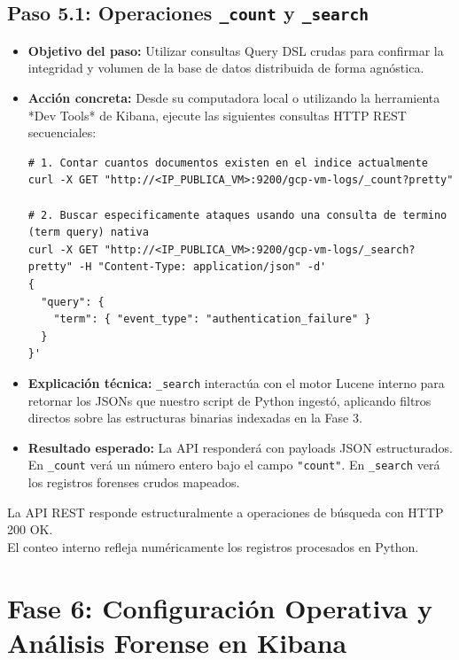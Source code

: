\documentclass[
  coursetitle={Cómputo Nube y Tecnologías Emergentes},
  coursehours={96},
  coursedate={Verano 2026},
  doctype={Guía de Laboratorio Práctico},
  otherlangs={english,french},
  authorname={Lázaro},
  authorsurname={Bustio-Martínez},
  authortitle={PhD},
  role={Profesor Investigador},
  email={lbustio@inaoe.mx},
  phone={5559504000},
  ext={7459},
  institution={Instituto Nacional de Astrofísica, Óptica y Electrónica (INAOE)},
  department={Maestría en Ciencias en Tecnologías de Seguridad},
  address={Luis Enrique Erro 1, Sta. Ma. Tonantzintla, San Andrés Cholula, CP 72840, Puebla, México},
  margin={0.5in}
]{../../lbustio_lecture_notes}
\begin{document}
\subsection{Paso 5.1: Operaciones \texttt{\_count} y \texttt{\_search}}
\begin{itemize}
    \item \textbf{Objetivo del paso:} Utilizar consultas Query DSL crudas para confirmar la integridad y volumen de la base de datos distribuida de forma agnóstica.
    \item \textbf{Acción concreta:} Desde su computadora local o utilizando la herramienta *Dev Tools* de Kibana, ejecute las siguientes consultas HTTP REST secuenciales:
\begin{verbatim}
# 1. Contar cuantos documentos existen en el indice actualmente
curl -X GET "http://<IP_PUBLICA_VM>:9200/gcp-vm-logs/_count?pretty"

# 2. Buscar especificamente ataques usando una consulta de termino (term query) nativa
curl -X GET "http://<IP_PUBLICA_VM>:9200/gcp-vm-logs/_search?pretty" -H "Content-Type: application/json" -d'
{
  "query": {
    "term": { "event_type": "authentication_failure" }
  }
}'
\end{verbatim}
    \item \textbf{Explicación técnica:} \texttt{\_search} interactúa con el motor Lucene interno para retornar los JSONs que nuestro script de Python ingestó, aplicando filtros directos sobre las estructuras binarias indexadas en la Fase 3.
    \item \textbf{Resultado esperado:} La API responderá con payloads JSON estructurados. En \texttt{\_count} verá un número entero bajo el campo \texttt{"count"}. En \texttt{\_search} verá los registros forenses crudos mapeados.
\end{itemize}

\begin{tcolorbox}[colback=green!5!white,colframe=green!60!black,title=\textbf{Checkpoint de Validación 4}]
\checkmark La API REST responde estructuralmente a operaciones de búsqueda con HTTP 200 OK.\\
\checkmark El conteo interno refleja numéricamente los registros procesados en Python.
\end{tcolorbox}

\section{Fase 6: Configuración Operativa y Análisis Forense en Kibana}
\end{document}
